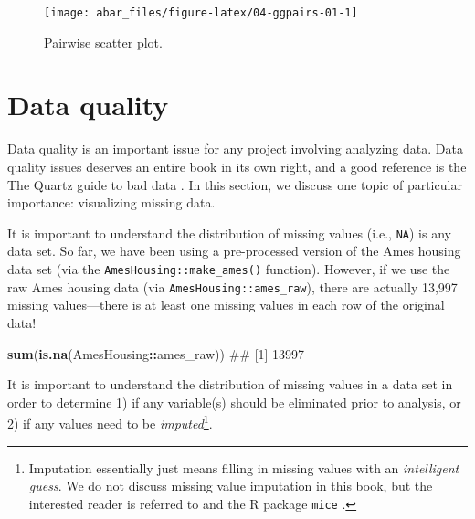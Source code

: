 \documentclass[]{book}
\newenvironment{Shaded}{\begin{snugshade}}{\end{snugshade}}
\newcommand{\KeywordTok}[1]{\textcolor[rgb]{0.13,0.29,0.53}{\textbf{#1}}}
\newcommand{\NormalTok}[1]{#1}
\newcommand{\OperatorTok}[1]{\textcolor[rgb]{0.81,0.36,0.00}{\textbf{#1}}}
\let\rmarkdownfootnote\footnote%
\def\footnote{\protect\rmarkdownfootnote}
\theoremstyle{definition}
\theoremstyle{definition}
\theoremstyle{definition}
\theoremstyle{remark}
\begin{document}
\begin{figure}

{\centering \texttt{[image: abar\_files/figure-latex/04-ggpairs-01-1]} 

}

\caption{Pairwise scatter plot.}\label{fig:04-ggpairs-01}
\end{figure}

\hypertarget{data-quality}{%
\section{Data quality}\label{data-quality}}

Data quality is an important issue for any project involving analyzing
data. Data quality issues deserves an entire book in its own right, and
a good reference is the The Quartz guide to bad data \citep{quartz}. In
this section, we discuss one topic of particular importance: visualizing
missing data.

It is important to understand the distribution of missing values (i.e.,
\texttt{NA}) is any data set. So far, we have been using a pre-processed
version of the Ames housing data set (via the
\texttt{AmesHousing::make\_ames()} function). However, if we use the raw
Ames housing data (via \texttt{AmesHousing::ames\_raw}), there are
actually 13,997 missing values---there is at least one missing values in
each row of the original data!

\begin{Shaded}
\begin{Highlighting}[]
\KeywordTok{sum}\NormalTok{(}\KeywordTok{is.na}\NormalTok{(AmesHousing}\OperatorTok{::}\NormalTok{ames_raw))}
\NormalTok{## [1] 13997}
\end{Highlighting}
\end{Shaded}

It is important to understand the distribution of missing values in a
data set in order to determine 1) if any variable(s) should be
eliminated prior to analysis, or 2) if any values need to be
\emph{imputed}\footnote{Imputation essentially just means filling in
  missing values with an \emph{intelligent guess}. We do not discuss
  missing value imputation in this book, but the interested reader is
  referred to \citet{van-flexible-2012} and the R package \texttt{mice}
  \citep{R-mice}.}.
\end{document}
